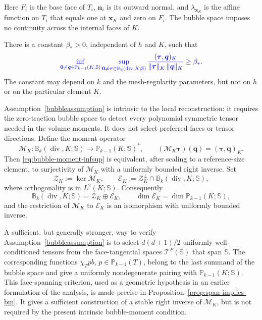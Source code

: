 \documentclass[review,hidelinks,onefignum,onetabnum]{siamart251216}
\renewcommand{\div}{\operatorname{div}}
\begin{document}
Here $F_i$ is the base face of $T_i$, $\boldsymbol n_i$ is its outward normal,
and $\lambda_{\boldsymbol x_K}$ is the affine function on $T_i$ that equals
one at $\boldsymbol x_K$ and zero on $F_i$. The bubble space imposes no
continuity across the internal faces of $K$.

\begin{assumption}\label{bubbleassumption}
There is a constant $\beta_*>0$, independent of $h$ and $K$, such that
\begin{equation}\label{eq:bubble-moment-infsup}
\color{blue}
\inf_{\boldsymbol 0\ne\boldsymbol q\in\mathbb P_{k-1}(K;\mathbb S)}
\sup_{\boldsymbol 0\ne\boldsymbol\tau\in\mathbb B_k(\div,K;\mathbb S)}
\frac{(\boldsymbol\tau,\boldsymbol q)_K}
{\|\boldsymbol\tau\|_K\,\|\boldsymbol q\|_K}\ge \beta_* .
\end{equation}
The constant may depend on $k$ and the mesh-regularity parameters, but not on
$h$ or on the particular element $K$.
\end{assumption}

Assumption~\ref{bubbleassumption} is intrinsic to the local reconstruction:
it requires the zero-traction bubble space to detect every polynomial symmetric
tensor needed in the volume moments.  It does not select preferred faces or
tensor directions.  Define the moment operator
\[
\mathcal M_K:\mathbb B_k(\div,K;\mathbb S)
\longrightarrow \mathbb P_{k-1}(K;\mathbb S)^*,\qquad
(\mathcal M_K\boldsymbol\tau)(\boldsymbol q)
=(\boldsymbol\tau,\boldsymbol q)_K.
\]
Then \eqref{eq:bubble-moment-infsup} is equivalent, after scaling to a
reference-size element, to surjectivity of $\mathcal M_K$ with a uniformly
bounded right inverse.  Set
\[
\mathcal Z_K:=\ker\mathcal M_K,
\qquad
\mathcal E_K:=\mathcal Z_K^\perp\cap\mathbb B_k(\div,K;\mathbb S),
\]
where orthogonality is in $L^2(K;\mathbb S)$.  Consequently
\[
\mathbb B_k(\div,K;\mathbb S)=\mathcal Z_K\oplus\mathcal E_K,
\qquad
\dim\mathcal E_K=\dim\mathbb P_{k-1}(K;\mathbb S),
\]
and the restriction of $\mathcal M_K$ to $\mathcal E_K$ is an isomorphism
with uniformly bounded inverse.

\begin{remark}\label{rem:oldspan}
A sufficient, but generally stronger, way to verify
Assumption~\ref{bubbleassumption} is to select $d(d+1)/2$ uniformly
well-conditioned tensors from the face-tangential spaces
$\mathscr T^F(\mathbb S)$ that span $\mathbb S$.  The corresponding functions
$\chi_T p b$, $p\in\mathbb P_{k-1}(T)$, belong to the last summand of the
bubble space and give a uniformly nondegenerate pairing with
$\mathbb P_{k-1}(K;\mathbb S)$.  This face-spanning criterion, used as a geometric hypothesis in an earlier
formulation of the analysis, is made precise in
Proposition~\ref{prop:span-implies-bm}. It gives a sufficient construction
of a stable right inverse of $\mathcal M_K$, but is not required by the
present intrinsic bubble-moment condition.
\end{remark}
\end{document}

